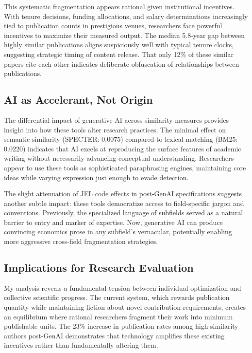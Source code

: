 \documentclass[12pt]{article}
\begin{document}
This systematic fragmentation appears rational given institutional incentives. With tenure decisions, funding allocations, and salary determinations increasingly tied to publication counts in prestigious venues, researchers face powerful incentives to maximize their measured output. The median 5.8-year gap between highly similar publications aligns suspiciously well with typical tenure clocks, suggesting strategic timing of content release. That only 12\% of these similar papers cite each other indicates deliberate obfuscation of relationships between publications.

\subsection{AI as Accelerant, Not Origin}

The differential impact of generative AI across similarity measures provides insight into how these tools alter research practices. The minimal effect on semantic similarity (SPECTER: 0.0075) compared to lexical matching (BM25: 0.0220) indicates that AI excels at reproducing the surface features of academic writing without necessarily advancing conceptual understanding. Researchers appear to use these tools as sophisticated paraphrasing engines, maintaining core ideas while varying expression just enough to evade detection.

The slight attenuation of JEL code effects in post-GenAI specifications suggests another subtle impact: these tools democratize access to field-specific jargon and conventions. Previously, the specialized language of subfields served as a natural barrier to entry and marker of expertise. Now, generative AI can produce convincing economics prose in any subfield's vernacular, potentially enabling more aggressive cross-field fragmentation strategies.

\subsection{Implications for Research Evaluation}

My analysis reveals a fundamental tension between individual optimization and collective scientific progress. The current system, which rewards publication quantity while maintaining fiction about novel contribution requirements, creates an equilibrium where rational researchers fragment their work into minimum publishable units. The 23\% increase in publication rates among high-similarity authors post-GenAI demonstrates that technology amplifies these existing incentives rather than fundamentally altering them.
\end{document}
